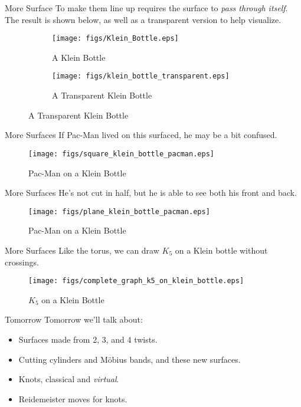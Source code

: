 \documentclass{beamer}
\begin{document}
    \begin{frame}{More Surface}
        To make them line up requires the surface to \textit{pass through itself}.
        The result is shown below, as well as a transparent version to help visualize.
        \begin{figure}
            \centering
            \begin{subfigure}[b]{0.49\textwidth}
                \centering
                \texttt{[image: figs/Klein\_Bottle.eps]}
                \caption{A Klein Bottle}
                \label{fig:klein}
            \end{subfigure}
            \begin{subfigure}[b]{0.49\textwidth}
                \centering
                \texttt{[image: figs/klein\_bottle\_transparent.eps]}
                \caption{A Transparent Klein Bottle}
                \label{fig:klein_transparent}
            \end{subfigure}
        \end{figure}
    \end{frame}
    \begin{frame}{More Surfaces}
        If Pac-Man lived on this surfaced, he may be a bit confused.
        \begin{figure}
            \centering
            \texttt{[image: figs/square\_klein\_bottle\_pacman.eps]}
            \caption{Pac-Man on a Klein Bottle}
            \label{fig:square_klein_pacman}
        \end{figure}
    \end{frame}
    \begin{frame}{More Surfaces}
        He's not cut in half, but he is able to see both his front and back.
        \begin{figure}
            \centering
            \texttt{[image: figs/plane\_klein\_bottle\_pacman.eps]}
            \caption{Pac-Man on a Klein Bottle}
            \label{fig:square_klein_pacman_plane}
        \end{figure}
    \end{frame}
    \begin{frame}{More Surfaces}
        Like the torus, we can draw $K_{5}$ on a Klein bottle without crossings.
        \begin{figure}
            \centering
            \texttt{[image: figs/complete\_graph\_k5\_on\_klein\_bottle.eps]}
            \caption{$K_{5}$ on a Klein Bottle}
            \label{fig:K5_Klein_Bottle}
        \end{figure}
    \end{frame}
    \begin{frame}{Tomorrow}
        Tomorrow we'll talk about:
        \begin{itemize}
            \item Surfaces made from 2, 3, and 4 twists.
            \item Cutting cylinders and M\"{o}bius bands, and these new surfaces.
            \item Knots, classical and \textit{virtual}.
            \item Reidemeister moves for knots.
        \end{itemize}
    \end{frame}
\end{document}
